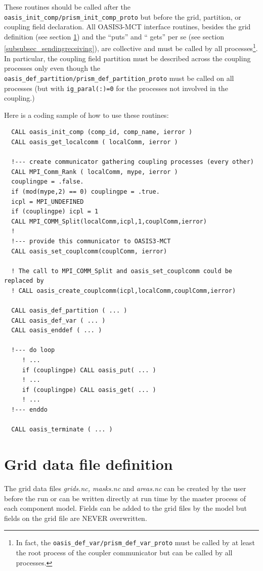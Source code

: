 These routines should be called after the {\tt oasis\_init\_comp/prism\_init\_comp\_proto}
but before the grid, partition, or coupling field declaration.
All OASIS3-MCT interface routines, besides the grid definition (see section \ref{subsubsec_griddef}) and the ``puts'' and `` gets'' per se (see section \ref{subsubsec_sendingreceiving}), are collective and must be called by all processes\footnote{In fact, the {\tt oasis\_def\_var/prism\_def\_var\_proto} must be called by at least the root process of the coupler
communicator but can be called by all processes.}. In particular, the coupling field partition must be described across the coupling processes only even though the {\tt  oasis\_def\_partition/prism\_def\_partition\_proto} must be called on all processes (but with {\tt ig\_paral(:)=0} for the processes not involved in the coupling.) 

Here is a coding sample of how to use these routines:
 
\begin{verbatim}
  CALL oasis_init_comp (comp_id, comp_name, ierror )
  CALL oasis_get_localcomm ( localComm, ierror )

  !--- create communicator gathering coupling processes (every other)
  CALL MPI_Comm_Rank ( localComm, mype, ierror )
  couplingpe = .false.
  if (mod(mype,2) == 0) couplingpe = .true. 
  icpl = MPI_UNDEFINED
  if (couplingpe) icpl = 1
  CALL MPI_COMM_Split(localComm,icpl,1,couplComm,ierror)
  !
  !--- provide this communicator to OASIS3-MCT
  CALL oasis_set_couplcomm(couplComm, ierror)
  
  ! The call to MPI_COMM_Split and oasis_set_couplcomm could be replaced by 
  ! CALL oasis_create_couplcomm(icpl,localComm,couplComm,ierror)

  CALL oasis_def_partition ( ... )
  CALL oasis_def_var ( ... )
  CALL oasis_enddef ( ... )

  !--- do loop
     ! ...
     if (couplingpe) CALL oasis_put( ... )
     ! ...
     if (couplingpe) CALL oasis_get( ... )
     ! ...
  !--- enddo

  CALL oasis_terminate ( ... )
\end{verbatim}

\section{Grid data file definition}
\label{subsubsec_griddef}

The grid data files {\em grids.nc, masks.nc} and {\em areas.nc} can be
created by the user before the run or can be written directly at run
time by the master process of each component model.  Fields can be
added to the grid files by the model but fields on the grid file
are NEVER overwritten.

